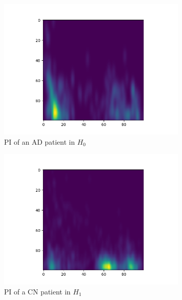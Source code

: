 \documentclass{article}
\begin{document}
\begin{figure}
\begin{subfigure}{0.32\textwidth}
    \includegraphics[width=\textwidth]{figures/PIs/Persistence_image_AD_h_0.png}
    \caption{PI of an AD patient in $H_0$}
  \end{subfigure}
  \begin{subfigure}{0.32\textwidth}
    \includegraphics[width=\textwidth]{figures/PIs/Persistence_image_CN_h_1.png}
    \caption{PI of a CN patient in $H_1$}
  \end{subfigure}
  \begin{subfigure}{0.32\textwidth}

\end{subfigure}
\end{figure}
\end{document}
